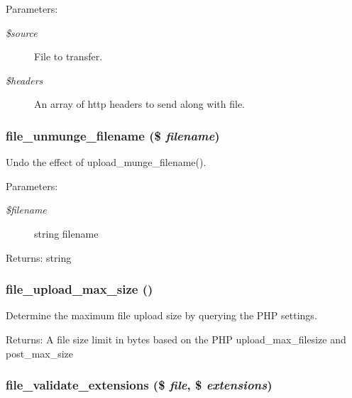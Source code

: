 \begin{Desc}
\item[Parameters:]
\begin{description}
\item[{\em \$source}]File to transfer. \item[{\em \$headers}]An array of http headers to send along with file. \end{description}
\end{Desc}
\hypertarget{group__file_gbda71018b91068bcd9fcd527a0493347}{
\subsubsection[{file\_\-unmunge\_\-filename}]{\setlength{\rightskip}{0pt plus 5cm}file\_\-unmunge\_\-filename (\$ {\em filename})}}
\label{group__file_gbda71018b91068bcd9fcd527a0493347}


Undo the effect of upload\_\-munge\_\-filename().

\begin{Desc}
\item[Parameters:]
\begin{description}
\item[{\em \$filename}]string filename \end{description}
\end{Desc}
\begin{Desc}
\item[Returns:]string \end{Desc}
\hypertarget{group__file_g7cf25e6a2532a1d022ee1c655f895380}{
\subsubsection[{file\_\-upload\_\-max\_\-size}]{\setlength{\rightskip}{0pt plus 5cm}file\_\-upload\_\-max\_\-size ()}}
\label{group__file_g7cf25e6a2532a1d022ee1c655f895380}


Determine the maximum file upload size by querying the PHP settings.

\begin{Desc}
\item[Returns:]A file size limit in bytes based on the PHP upload\_\-max\_\-filesize and post\_\-max\_\-size \end{Desc}
\hypertarget{group__file_g7f9c8080c156bba75bf4ad9812378a2c}{
\subsubsection[{file\_\-validate\_\-extensions}]{\setlength{\rightskip}{0pt plus 5cm}file\_\-validate\_\-extensions (\$ {\em file}, \/  \$ {\em extensions})}}
\label{group__file_g7f9c8080c156bba75bf4ad9812378a2c}


